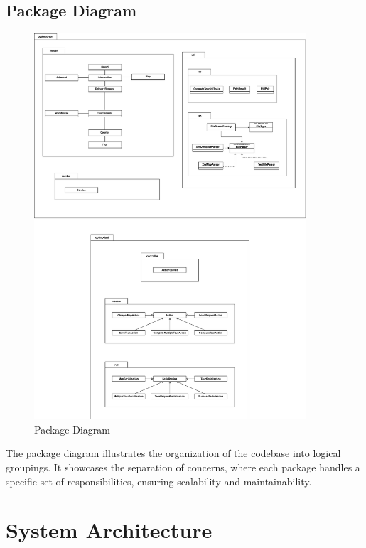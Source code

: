 \documentclass[a4paper]{article}
\begin{document}
\subsection{Package Diagram}
\begin{figure}[H]
    \centering
    \includegraphics[width=0.9\textwidth]{images/package.pdf}
    \caption{Package Diagram}
\end{figure}
The package diagram illustrates the organization of the codebase into logical groupings. It showcases the separation of concerns, where each package handles a specific set of responsibilities, ensuring scalability and maintainability.


\section{System Architecture}
\end{document}
